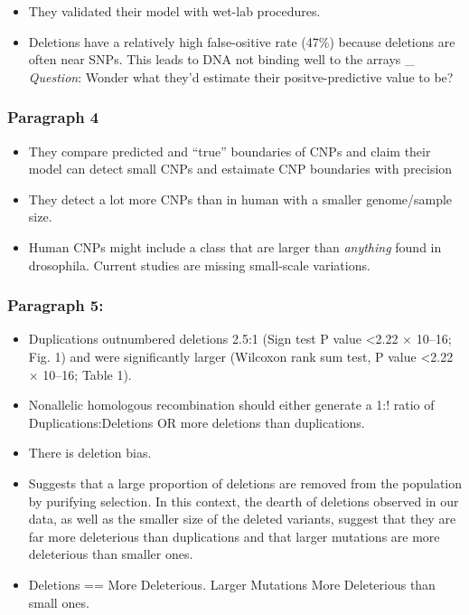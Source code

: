 \documentclass[]{book}
\providecommand{\tightlist}{%
  \setlength{\itemsep}{0pt}\setlength{\parskip}{0pt}}
\begin{document}
\begin{itemize}
\tightlist
\item
  They validated their model with wet-lab procedures.
\item
  Deletions have a relatively high false-ositive rate (47\%) because deletions are often near SNPs. This leads to DNA not binding well to the arrays
  \_ \emph{Question}: Wonder what they'd estimate their positve-predictive value to be?
\end{itemize}

\hypertarget{paragraph-4}{%
\subsubsection{Paragraph 4}\label{paragraph-4}}

\begin{itemize}
\tightlist
\item
  They compare predicted and ``true'' boundaries of CNPs and claim their model can detect small CNPs and estaimate CNP boundaries with precision
\item
  They detect a lot more CNPs than in human with a smaller genome/sample size.
\item
  Human CNPs might include a class that are larger than \emph{anything} found in drosophila. Current studies are missing small-scale variations.
\end{itemize}

\hypertarget{paragraph-5}{%
\subsubsection{Paragraph 5:}\label{paragraph-5}}

\begin{itemize}
\tightlist
\item
  Duplications outnumbered deletions 2.5:1 (Sign test P value \textless{}2.22 × 10--16; Fig. 1) and were significantly larger (Wilcoxon rank sum test, P value \textless{}2.22 × 10--16; Table 1).
\item
  Nonallelic homologous recombination should either generate a 1:! ratio of Duplications:Deletions OR more deletions than duplications.
\item
  There is deletion bias.
\item
  Suggests that a large proportion of deletions are removed from the population by purifying selection. In this context, the dearth of deletions observed in our data, as well as the smaller size of the deleted variants, suggest that they are far more deleterious than duplications and that larger mutations are more deleterious than smaller ones.
\item
  Deletions == More Deleterious. Larger Mutations More Deleterious than small ones.
\end{itemize}
\end{document}
